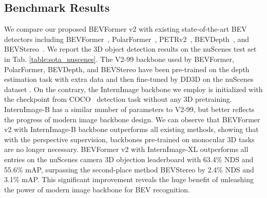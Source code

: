 \documentclass[10pt,twocolumn,letterpaper]{article}
\begin{document}
\subsection{Benchmark Results}
We compare our proposed BEVFormer v2 with existing state-of-the-art BEV detectors including BEVFormer~\cite{bevformer}, PolarFormer~\cite{polarformer}, PETRv2~\cite{petrv2}, BEVDepth~\cite{bevdepth}, and BEVStereo~\cite{bevstereo}. 
We report the 3D object detection results on the nuScenes test set in Tab. \ref{table:sota_nuscenes}. 
The V2-99 \cite{Vovnet} backbone used by BEVFormer, PolarFormer, BEVDepth, and BEVStereo have been pre-trained on the depth estimation task with extra data and then fine-tuned by DD3D \cite{DD3D} on the nuScenes dataset \cite{nuscenes}.
On the contrary, the InternImage \cite{InternImage} backbone we employ is initialized with the checkpoint from COCO~\cite{COCO} detection task without any 3D pretraining.
InternImage-B has a similar number of parameters to V2-99, but better reflects the progress of modern image backbone design.
We can observe that BEVFormer v2 with InternImage-B backbone outperforms all existing methods, showing that with the perspective supervision, backbones pre-trained on monocular 3D tasks are no longer necessary.  
BEVFormer v2 with InternImage-XL outperforms all entries on the nuScenes camera 3D objection leaderboard with 63.4\% NDS and 55.6\% mAP, surpassing the second-place method BEVStereo by 2.4\% NDS and 3.1\% mAP. 
This significant improvement reveals the huge benefit of unleashing the power of modern image backbone for BEV recognition.
\end{document}
